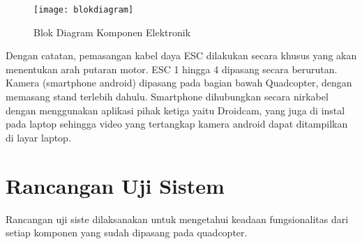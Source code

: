 \begin{figure}[H]
	\centering
	\texttt{[image: blokdiagram]}
	\caption{Blok Diagram Komponen Elektronik}
	\label{fig:blokdiagram}
\end{figure}

Dengan catatan, pemasangan kabel daya ESC dilakukan secara khusus yang akan menentukan arah putaran motor.  ESC 1 hingga 4 dipasang secara berurutan. Kamera (smartphone android) dipasang pada bagian bawah Quadcopter, dengan memasang stand terlebih dahulu. Smartphone dihubungkan secara nirkabel dengan menggunakan aplikasi pihak ketiga yaitu Droidcam, yang juga di instal pada laptop sehingga video yang tertangkap kamera android dapat ditampilkan di layar laptop. 

\section{Rancangan Uji Sistem}
Rancangan uji siste dilaksanakan untuk mengetahui keadaan fungsionalitas dari setiap komponen yang sudah dipasang pada quadcopter.

